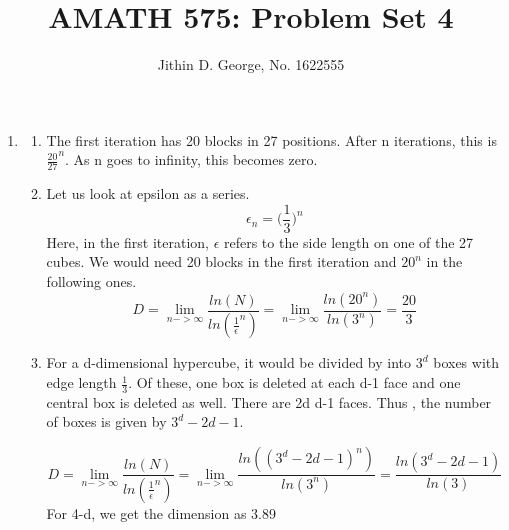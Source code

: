 \documentclass[a4paper,11pt]{article}
\title{AMATH 575: Problem Set 4}
\author{Jithin D. George, No. 1622555}
\begin{document}
\maketitle
\begin{enumerate}

	\item

	\begin{enumerate}
		\item
		The first iteration has 20 blocks in 27 positions. After n iterations, this is ${\frac{20}{27}}^n$. As n goes to infinity, this becomes zero.
		
		\item
		Let us look at epsilon as a series.
		\[\epsilon_n = \big(\frac{1}{3}\big)^n\]
		Here, in the first iteration, $\epsilon$ refers to the side length on one of the 27 cubes. We would need 20 blocks in the first iteration and $20^n$ in the following ones.
		\[ D= \lim_{n -> \infty } \frac{ln(N)}{ln({\frac{1}{\epsilon}}^n)} = \lim_{n -> \infty } \frac{ln(20^n)}{ln({3}^n)} = \frac{20}{3}\] 
		\item
		For a d-dimensional hypercube, it would be divided by into $3^d$ boxes with edge length $\frac{1}{3}$.
		Of these, one box is deleted at each d-1 face and one central box is deleted as well. There are 2d d-1 faces.
	Thus , the number of boxes is given by $3^d-2d-1$.
	
		  
\[ D= \lim_{n -> \infty } \frac{ln(N)}{ln({\frac{1}{\epsilon}}^n)} = \lim_{n -> \infty } \frac{ln((3^d-2d-1)^n)}{ln(3^n)} =\frac{ln(3^d-2d-1)}{ln(3)}\] 
For 4-d, we get the dimension as 3.89

	\end{enumerate}	
	 

\end{enumerate}
\end{document}
